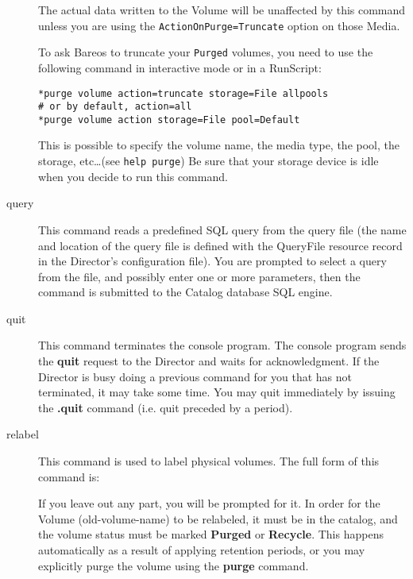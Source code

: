 \begin{description}
The actual data written to the Volume will be unaffected by this command unless
you are using the \texttt{ActionOnPurge=Truncate} option on those Media.

To ask Bareos to truncate your \texttt{Purged} volumes, you need to use the
following command in interactive mode or in a RunScript:
\begin{verbatim}
*purge volume action=truncate storage=File allpools
# or by default, action=all
*purge volume action storage=File pool=Default
\end{verbatim}

This is possible to specify the volume name, the media type, the pool, the
storage, etc\dots (see \texttt{help purge}) Be sure that your storage device is
idle when you decide to run this command.

\item [query]
   This command reads a predefined SQL query from  the query file (the name and
   location of the  query file is defined with the QueryFile resource record in
   the Director's configuration file). You are prompted to select  a query from
   the file, and possibly enter one or more parameters,  then the command is
   submitted to the Catalog database SQL engine.

\item [quit]
   This command terminates the console program. The  console program sends the
   {\bf quit} request to the Director  and waits for acknowledgment. If the
   Director is busy doing  a previous command for you that has not terminated, it
   may  take some time. You may quit immediately by issuing the  {\bf .quit}
   command (i.e. quit preceded by a period).

\item [relabel]
   This command is used to label physical volumes.  The full form of this
   command is:


   If you leave out any part, you will be prompted for it.  In order for
   the Volume (old-volume-name) to be relabeled, it must be in the catalog,
   and the volume status must be marked {\bf Purged} or {\bf Recycle}.
   This happens automatically as a result of applying retention periods, or
   you may explicitly purge the volume using the {\bf purge} command.


\end{description}
